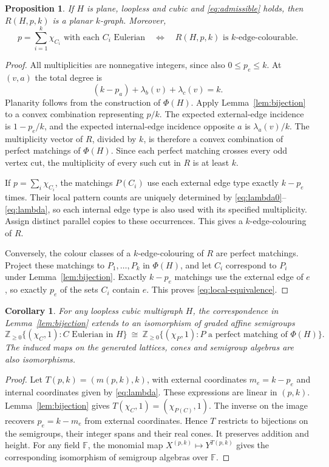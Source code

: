 \documentclass[10pt]{article}
\newtheorem{proposition}[theorem]{Proposition}
\newtheorem{corollary}[theorem]{Corollary}
\theoremstyle{definition}
\theoremstyle{remark}
\newcommand{\NN}{\mathbb Z_{\geq0}}
\begin{document}
\begin{proposition}\label{prop:gadget}
If $H$ is plane, loopless and cubic and \eqref{eq:admissible} holds, then $R(H,p,k)$ is a planar $k$-graph.
Moreover,
\begin{equation}\label{eq:local-equivalence}
 p=\sum_{i=1}^k\chi_{C_i}\text{ with each }C_i\text{ Eulerian}
 \quad\Longleftrightarrow\quad R(H,p,k)\text{ is }k\text{-edge-colourable}.
\end{equation}
\end{proposition}
\begin{proof}
All multiplicities are nonnegative integers, since also $0\leq p_e\leq k$.
At $(v,a)$ the total degree is
\[
 (k-p_a)+\lambda_b(v)+\lambda_c(v)=k.
\]
Planarity follows from the construction of $\Phi(H)$.
Apply Lemma~\ref{lem:bijection} to a convex combination representing $p/k$.
The expected external-edge incidence is $1-p_e/k$, and the expected internal-edge incidence opposite $a$ is $\lambda_a(v)/k$.
The multiplicity vector of $R$, divided by $k$, is therefore a convex combination of perfect matchings of $\Phi(H)$.
Since each perfect matching crosses every odd vertex cut, the multiplicity of every such cut in $R$ is at least $k$.

If $p=\sum_i\chi_{C_i}$, the matchings $P(C_i)$ use each external edge type exactly $k-p_e$ times.
Their local pattern counts are uniquely determined by \eqref{eq:lambda0}--\eqref{eq:lambda}, so each internal edge type is also used with its specified multiplicity.
Assign distinct parallel copies to these occurrences.
This gives a $k$-edge-colouring of $R$.

Conversely, the colour classes of a $k$-edge-colouring of $R$ are perfect matchings.
Project these matchings to $P_1,\ldots,P_k$ in $\Phi(H)$, and let $C_i$ correspond to $P_i$ under Lemma~\ref{lem:bijection}.
Exactly $k-p_e$ matchings use the external edge of $e$, so exactly $p_e$ of the sets $C_i$ contain $e$.
This proves \eqref{eq:local-equivalence}.
\end{proof}

\begin{corollary}\label{cor:semigroup}
For any loopless cubic multigraph $H$, the correspondence in Lemma~\ref{lem:bijection} extends to an isomorphism of graded affine semigroups
\[
 \NN\{(\chi_C,1):C\text{ Eulerian in }H\}
 \ \cong\ 
 \NN\{(\chi_P,1):P\text{ a perfect matching of }\Phi(H)\}.
\]
The induced maps on the generated lattices, cones and semigroup algebras are also isomorphisms.
\end{corollary}
\begin{proof}
Let $T(p,k)=(m(p,k),k)$, with external coordinates $m_e=k-p_e$ and internal coordinates given by \eqref{eq:lambda}.
These expressions are linear in $(p,k)$.
Lemma~\ref{lem:bijection} gives $T(\chi_C,1)=(\chi_{P(C)},1)$.
The inverse on the image recovers $p_e=k-m_e$ from external coordinates.
Hence $T$ restricts to bijections on the semigroups, their integer spans and their real cones.
It preserves addition and height.
For any field $\mathbb F$, the monomial map $X^{(p,k)}\mapsto Y^{T(p,k)}$ gives the corresponding isomorphism of semigroup algebras over $\mathbb F$.
\end{proof}
\end{document}
